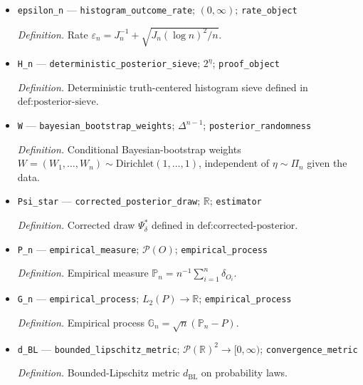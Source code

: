 \documentclass{article}
\begin{document}
\begin{itemize}
  \par\smallskip\noindent\emph{Definition.} Rate \(\rho_n=J_n^{-1}+\sqrt{J_n\log n/n}\).
  \item \texttt{epsilon\_\allowbreak{}n} --- \texttt{histogram\_\allowbreak{}outcome\_\allowbreak{}rate}; \((0,\infty)\); \texttt{rate\_\allowbreak{}object}
  \par\smallskip\noindent\emph{Definition.} Rate \(\varepsilon_n=J_n^{-1}+\sqrt{J_n(\log n)^2/n}\).
  \item \texttt{H\_\allowbreak{}n} --- \texttt{deterministic\_\allowbreak{}posterior\_\allowbreak{}sieve}; \(2^\eta\); \texttt{proof\_\allowbreak{}object}
  \par\smallskip\noindent\emph{Definition.} Deterministic truth-centered histogram sieve defined in \(\text{def:posterior-sieve}\).
  \item \texttt{W} --- \texttt{bayesian\_\allowbreak{}bootstrap\_\allowbreak{}weights}; \(\Delta^{n-1}\); \texttt{posterior\_\allowbreak{}randomness}
  \par\smallskip\noindent\emph{Definition.} Conditional Bayesian-bootstrap weights \(W=(W_1,\ldots,W_n)\sim\mathrm{Dirichlet}(1,\ldots,1)\), independent of \(\eta\sim\Pi_n\) given the data.
  \item \texttt{Psi\_\allowbreak{}star} --- \texttt{corrected\_\allowbreak{}posterior\_\allowbreak{}draw}; \(\mathbb R\); \texttt{estimator}
  \par\smallskip\noindent\emph{Definition.} Corrected draw \(\Psi_\delta^*\) defined in \(\text{def:corrected-posterior}\).
  \item \texttt{P\_\allowbreak{}n} --- \texttt{empirical\_\allowbreak{}measure}; \(\mathcal P(O)\); \texttt{empirical\_\allowbreak{}process}
  \par\smallskip\noindent\emph{Definition.} Empirical measure \(\mathbb P_n=n^{-1}\sum_{i=1}^n\delta_{O_i}\).
  \item \texttt{G\_\allowbreak{}n} --- \texttt{empirical\_\allowbreak{}process}; \(L_2(P)\to\mathbb R\); \texttt{empirical\_\allowbreak{}process}
  \par\smallskip\noindent\emph{Definition.} Empirical process \(\mathbb G_n=\sqrt n(\mathbb P_n-P)\).
  \item \texttt{d\_\allowbreak{}BL} --- \texttt{bounded\_\allowbreak{}lipschitz\_\allowbreak{}metric}; \(\mathcal P(\mathbb R)^2\to[0,\infty)\); \texttt{convergence\_\allowbreak{}metric}
  \par\smallskip\noindent\emph{Definition.} Bounded-Lipschitz metric \(d_{\mathrm{BL}}\) on probability laws.

\end{itemize}
\end{document}
